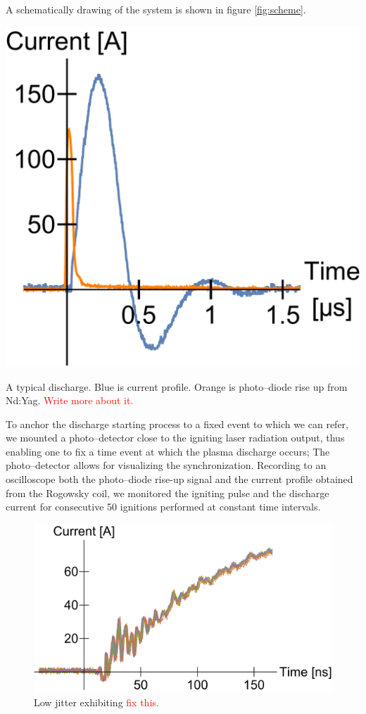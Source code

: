 \documentclass[justified,nofonts,nobib,openany]{tufte-book}
\begin{document}
A schematically drawing of the system is shown in figure \ref{fig:scheme}.
\begin{marginfigure}
    \includegraphics[width=\marginparwidth]{figures/jitter/discharge_sample.pdf}
    \caption{A typical discharge. Blue is current profile. Orange is photo--diode rise up from Nd:Yag. \textcolor{red}{Write more about it.}}
    \label{discharge_sample}
\end{marginfigure}
To anchor the discharge starting process to a fixed event to which we can refer, we mounted a photo--detector close to the igniting laser radiation output, thus enabling one to fix a time event at which the plasma discharge occurs; The photo--detector allows for visualizing the synchronization. Recording to an oscilloscope both the photo--diode rise-up signal and the current profile obtained from the Rogowsky coil, we monitored the igniting pulse and the discharge current for consecutive 50 ignitions performed at constant time intervals.
\begin{figure}
    \centering
    \includegraphics[width=\textwidth]{figures/jitter/low_jitter.pdf}
    \caption{Low jitter exhibiting \textcolor{red}{fix this.}}
    \label{fig:low_jitter}
\end{figure}
\end{document}
